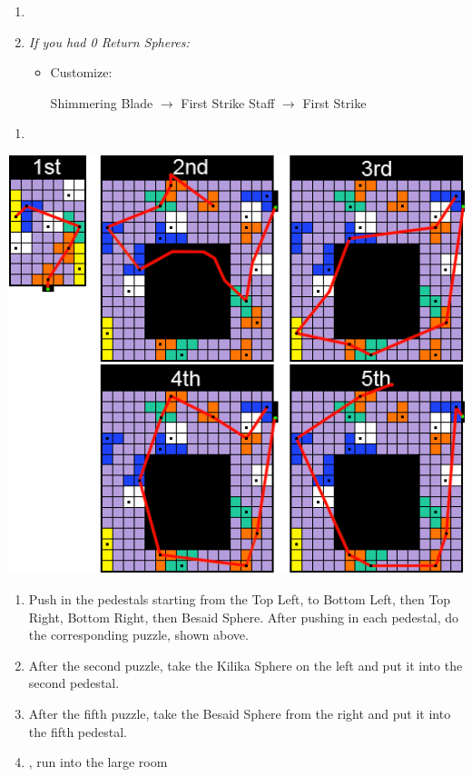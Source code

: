 \begin{enumerate}[resume]
    \item \formation{\tidus}{\auron}{\yuna}
    \bothcb
    \item \textit{If you had 0 Return Spheres:}
    \begin{itemize}
        \item Customize:
        \begin{itemize}
            \auronf Shimmering Blade $\rightarrow$ First Strike
            \yunaf Staff $\rightarrow$ First Strike
        \end{itemize}
    \end{itemize}
\end{enumerate}
\begin{enumerate}[resume]
    \item {\large \save}
\end{enumerate}
\includegraphics[width=.95\columnwidth]{graphics/Zanarkand_Trials}
\begin{enumerate}[resume]
    \item Push in the pedestals starting from the Top Left, to Bottom Left, then Top Right, Bottom Right, then Besaid Sphere. After pushing in each pedestal, do the corresponding puzzle, shown above.
    \item After the second puzzle, take the Kilika Sphere on the left and put it into the second pedestal.
    \item After the fifth puzzle, take the Besaid Sphere from the right and put it into the fifth pedestal.
    \item \cs, run into the large room
\end{enumerate}
